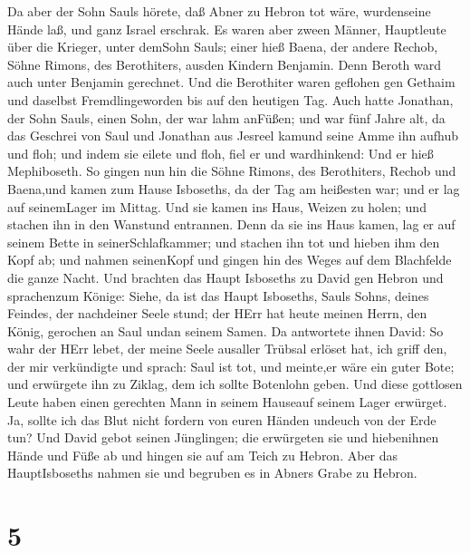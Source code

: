  Da aber der Sohn Sauls hörete, daß Abner zu Hebron tot
wäre, wurdenseine Hände laß, und ganz Israel erschrak.  Es
waren aber zween Männer, Hauptleute über die Krieger, unter demSohn
Sauls; einer hieß Baena, der andere Rechob, Söhne Rimons, des
Berothiters, ausden Kindern Benjamin. Denn Beroth ward auch unter
Benjamin gerechnet.  Und die Berothiter waren geflohen gen
Gethaim und daselbst Fremdlingeworden bis auf den heutigen Tag.
 Auch hatte Jonathan, der Sohn Sauls, einen Sohn, der war
lahm anFüßen; und war fünf Jahre alt, da das Geschrei von Saul und
Jonathan aus Jesreel kamund seine Amme ihn aufhub und floh; und indem
sie eilete und floh, fiel er und wardhinkend: Und er hieß Mephiboseth.
 So gingen nun hin die Söhne Rimons, des Berothiters, Rechob
und Baena,und kamen zum Hause Isboseths, da der Tag am heißesten war;
und er lag auf seinemLager im Mittag.  Und sie kamen ins
Haus, Weizen zu holen; und stachen ihn in den Wanstund entrannen.
 Denn da sie ins Haus kamen, lag er auf seinem Bette in
seinerSchlafkammer; und stachen ihn tot und hieben ihm den Kopf ab; und
nahmen seinenKopf und gingen hin des Weges auf dem Blachfelde die ganze
Nacht.  Und brachten das Haupt Isboseths zu David gen Hebron
und sprachenzum Könige: Siehe, da ist das Haupt Isboseths, Sauls Sohns,
deines Feindes, der nachdeiner Seele stund; der HErr hat heute meinen
Herrn, den König, gerochen an Saul undan seinem Samen.  Da
antwortete ihnen David: So wahr der HErr lebet, der meine Seele ausaller
Trübsal erlöset hat,  ich griff den, der mir verkündigte
und sprach: Saul ist tot, und meinte,er wäre ein guter Bote; und
erwürgete ihn zu Ziklag, dem ich sollte Botenlohn geben. 
Und diese gottlosen Leute haben einen gerechten Mann in seinem Hauseauf
seinem Lager erwürget. Ja, sollte ich das Blut nicht fordern von euren
Händen undeuch von der Erde tun?  Und David gebot seinen
Jünglingen; die erwürgeten sie und hiebenihnen Hände und Füße ab und
hingen sie auf am Teich zu Hebron. Aber das HauptIsboseths nahmen sie
und begruben es in Abners Grabe zu Hebron.

\hypertarget{section-4}{%
\section{5}\label{section-4}}

